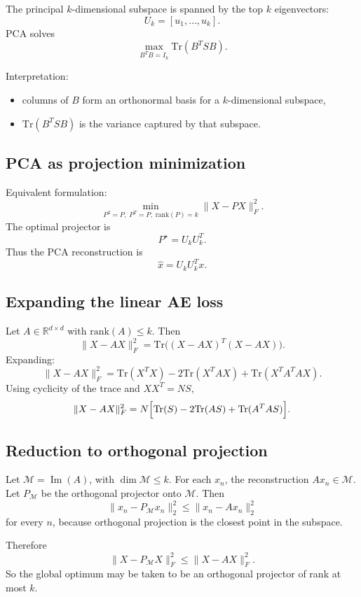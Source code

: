 \documentclass[%
oneside,                 %
final,                   %
10pt]{article}
\begin{document}
The principal \(k\)-dimensional subspace is spanned by the top \(k\) eigenvectors:
\[
U_k = [u_1,\dots,u_k].
\]
PCA solves
\[
\max_{B^TB=I_k}\mathrm{Tr}(B^T S B).
\]
\begin{block}{Interpretation: }
\begin{itemize}
\item columns of \(B\) form an orthonormal basis for a \(k\)-dimensional subspace,

\item \(\mathrm{Tr}(B^TSB)\) is the variance captured by that subspace.
\end{itemize}

\noindent
\end{block}

\subsection{PCA as projection minimization}

Equivalent formulation:
\[
\min_{P^2=P,\; P^T=P,\; \mathrm{rank}(P)=k}\|X-PX\|_F^2.
\]
The optimal projector is
\[
P^\star = U_k U_k^T.
\]
Thus the PCA reconstruction is
\[
\hat x = U_k U_k^T x.
\]

\subsection{Expanding the linear AE loss}

Let \(A\in\mathbb{R}^{d\times d}\) with \(\mathrm{rank}(A)\le k\). Then
\[
\|X-AX\|_F^2
=
\mathrm{Tr}\bigl((X-AX)^T(X-AX)\bigr).
\]
Expanding:
\[
\|X-AX\|_F^2
=
\mathrm{Tr}(X^TX)-2\mathrm{Tr}(X^TAX)+\mathrm{Tr}(X^TA^TAX).
\]
Using cyclicity of the trace and \(XX^T = NS\),
\[
\|X-AX\|_F^2
=
N\Bigl[\mathrm{Tr}(S)-2\mathrm{Tr}(AS)+\mathrm{Tr}(A^TAS)\Bigr].
\]

\subsection{Reduction to orthogonal projection}

Let \(\mathcal{M}=\operatorname{Im}(A)\), with \(\dim \mathcal{M}\le k\).
For each \(x_n\), the reconstruction \(Ax_n\in \mathcal{M}\).
Let \(P_{\mathcal{M}}\) be the orthogonal projector onto \(\mathcal{M}\). Then
\[
\|x_n-P_{\mathcal{M}}x_n\|_2^2 \le \|x_n-Ax_n\|_2^2
\]
for every \(n\), because orthogonal projection is the closest point in the subspace.

Therefore
\[
\|X-P_{\mathcal{M}}X\|_F^2 \le \|X-AX\|_F^2.
\]
So the global optimum may be taken to be an orthogonal projector of rank at most \(k\).
\end{document}
